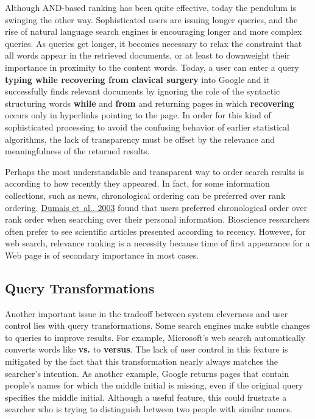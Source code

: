 \documentclass[sigconf,nonacm,screen,pbalance]{acmart}
\begin{document}
Although AND-based ranking has been quite effective, today the pendulum is swinging the other way.
Sophisticated users are issuing longer queries, and the rise of natural language search engines is
encouraging longer and more complex queries. As queries get longer, it becomes necessary to relax the
constraint that all words appear in the retrieved documents, or at least to downweight their importance
in proximity to the content words. Today, a user can enter a query {\bf  typing while recovering from
clavical surgery} into Google and it successfully finds relevant documents by ignoring the role of
the syntactic structuring words {\bf  while} and {\bf  from} and returning pages in which {\bf 
recovering} occurs only in hyperlinks pointing to the page. In order for this kind of sophisticated
processing to avoid the confusing behavior of earlier statistical algorithms, the lack of transparency
must be offset by the relevance and meaningfulness of the returned results.

Perhaps the most understandable and transparent way to order search results is according to how recently
they appeared. In fact, for some information collections, such as news, chronological ordering can be
preferred over rank ordering. \href{https://searchuserinterfaces.com/book/sui_references.html#dumais2003svs}{Dumais et~al., 2003} found that users preferred chronological order over rank order when
searching over their personal information. Bioscience researchers often prefer to see scientific
articles presented according to recency. However, for web search, relevance ranking is a necessity
because time of first appearance for a Web page is of secondary importance in most cases.

\subsection{Query Transformations}

Another important issue in the tradeoff between system cleverness and user control lies with query
transformations. Some search engines make subtle changes to queries to improve results. For example,
Microsoft's web search automatically converts words like {\bf  vs.} to {\bf  versus}. The lack of user
control in this feature is mitigated by the fact that this transformation nearly always matches the
searcher's intention. As another example, Google returns pages that contain people's names for which the
middle initial is missing, even if the original query specifies the middle initial. Although a useful
feature, this could frustrate a searcher who is trying to distinguish between two people with similar
names.
\end{document}
